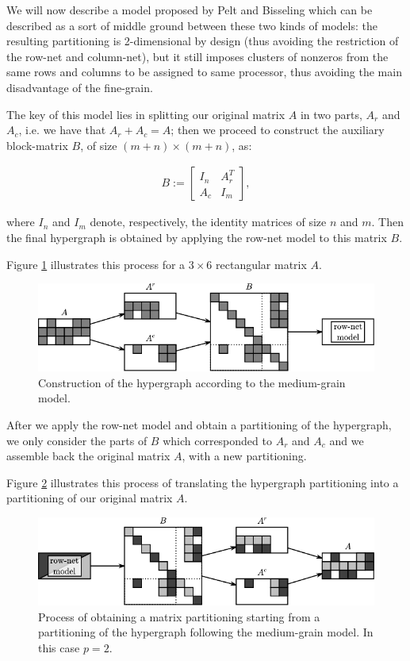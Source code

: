 We will now describe a model proposed by Pelt and Bisseling \cite{mediumgrain} which can be described as a sort of middle ground between these two kinds of models: the resulting partitioning is 2-dimensional by design (thus avoiding the restriction of the row-net and column-net), but it still imposes clusters of nonzeros from the same rows and columns to be assigned to same processor, thus avoiding the main disadvantage of the fine-grain.

The key of this model lies in splitting our original matrix $A$ in two parts, $A_r$ and $A_c$, i.e. we have that $A_r + A_c = A$; then we proceed to construct the auxiliary block-matrix $B$, of size $(m+n) \times (m+n)$, as:

\begin{align}
	B:=	\begin{bmatrix}
		I_n & A_r^T \\
		A_c & I_m
	\end{bmatrix},
	\label{eq:Bmatrix}
\end{align}

where $I_n$ and $I_m$ denote, respectively, the identity matrices of size $n$ and $m$. Then the final hypergraph is obtained by applying the row-net model to this matrix $B$. 

Figure \ref{fig:mediumgrain-1} illustrates this process for a $3 \times 6$ rectangular matrix $A$.

\begin{figure}[h]
	\centering
	\includegraphics{img/mg-1}
	\caption{Construction of the hypergraph according to the medium-grain model.}
	\label{fig:mediumgrain-1}
\end{figure}

After we apply the row-net model and obtain a partitioning of the hypergraph, we only consider the parts of $B$ which corresponded to $A_r$ and $A_c$ and we assemble back the original matrix $A$, with a new partitioning.

Figure \ref{fig:mediumgrain-2} illustrates this process of translating the hypergraph partitioning into a partitioning of our original matrix $A$.

\begin{figure}[h]
	\centering
	\includegraphics{img/mg-2}
	\caption{Process of obtaining a matrix partitioning starting from a partitioning of the hypergraph following the medium-grain model. In this case $p=2$.}
	\label{fig:mediumgrain-2}
\end{figure}

